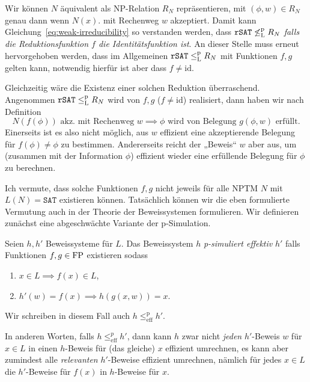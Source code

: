 Wir können $N$ äquivalent als NP-Relation $R_N$ repräsentieren, mit $(\phi, w) \in R_N$ genau dann wenn $N(x)$. mit Rechenweg $w$ akzeptiert.
Damit kann Gleichung~\ref{eq:weak-irreducibility} so verstanden werden, dass $\mathtt{rSAT} \not\leq_\mathrm{L}^\mathrm{p} R_N$ \emph{falls die Reduktionsfunktion $f$ die Identitätsfunktion ist}.
An dieser Stelle muss erneut hervorgehoben werden, dass im Allgemeinen $\mathtt{rSAT} \leq_\mathrm{L}^\mathrm{p} R_N$ mit Funktionen $f,g$ gelten kann, notwendig hierfür ist aber dass $f\neq\mathrm{id}$.

Gleichzeitig wäre die Existenz einer solchen Reduktion überraschend. Angenommen $\mathtt{rSAT} \leq_\mathrm{L}^\mathrm{p} R_N$ wird von $f,g$ ($f\neq\mathrm{id}$) realisiert, dann haben wir nach Definition
\[ N(f(\phi)) \text{ akz. mit Rechenweg $w$} \implies \phi \text{ wird von Belegung $g(\phi, w)$ erfüllt}. \]
Einerseits ist es also nicht möglich, aus $w$ effizient eine akzeptierende Belegung für $f(\phi)\neq\phi$ zu bestimmen.
Andererseits reicht der „Beweis“ $w$ aber aus, um (zusammen mit der Information $\phi$) effizient wieder eine erfüllende Belegung für $\phi$ zu berechnen. 

Ich vermute, dass solche Funktionen $f,g$ nicht jeweils für alle NPTM $N$ mit $L(N)=\mathtt{SAT}$ existieren können.
Tatsächlich können wir die eben formulierte Vermutung auch in der Theorie der Beweissystemen formulieren.
Wir definieren zunächst eine abgeschwächte Variante der p-Simulation.
\begin{definition}
    Seien $h,h'$ Beweissysteme für $L$. Das Beweissystem $h$ \emph{p-simuliert effektiv} $h'$ falls Funktionen $f,g\in\mathrm{FP}$ existieren sodass
    \begin{enumerate}
        \item $x\in L \implies f(x)\in L$,
        \item $ h'(w)=f(x) \implies h(g(x, w)) = x. $
    \end{enumerate}
    Wir schreiben in diesem Fall auch $h\leq^\mathrm p_\mathrm{eff} h'$.
\end{definition}
In anderen Worten, falls $h\leq^p_\mathrm{eff} h'$, dann kann $h$ zwar nicht \emph{jeden} $h'$-Beweis $w$ für $x\in L$ in einen $h$-Beweis für (das gleiche) $x$ effizient umrechnen, es kann aber zumindest alle \emph{relevanten} $h'$-Beweise effizient umrechnen, nämlich für jedes $x\in L$ die $h'$-Beweise für $f(x)$ in $h$-Beweise für $x$.

